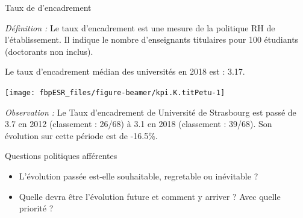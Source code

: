 \documentclass[
  8pt,
  french,
  ignorenonframetext,
  landscape]{beamer}
\providecommand{\tightlist}{%
  \setlength{\itemsep}{0pt}\setlength{\parskip}{0pt}}
\begin{document}
\begin{frame}{Taux de d'encadrement}
\protect\hypertarget{taux-de-dencadrement}{}

\emph{Définition :} Le taux d'encadrement est une mesure de la politique
RH de l'établissement. Il indique le nombre d'enseignants titulaires
pour 100 étudiants (doctorants non inclus).

Le taux d'encadrement médian des universités en 2018 est : 3.17.

\begin{center}\texttt{[image: fbpESR\_files/figure-beamer/kpi.K.titPetu-1]} \end{center}

\emph{Observation :} Le Taux d'encadrement de Université de Strasbourg
est passé de 3.7 en 2012 (classement : 26/68) à 3.1 en 2018 (classement
: 39/68). Son évolution sur cette période est de -16.5\%.

\begin{block}{Questions politiques afférentes}

\begin{itemize}
\tightlist
\item
  L'évolution passée est-elle souhaitable, regretable ou inévitable ?
\item
  Quelle devra être l'évolution future et comment y arriver ? Avec
  quelle priorité ?
\end{itemize}

\end{block}

\end{frame}
\end{document}

